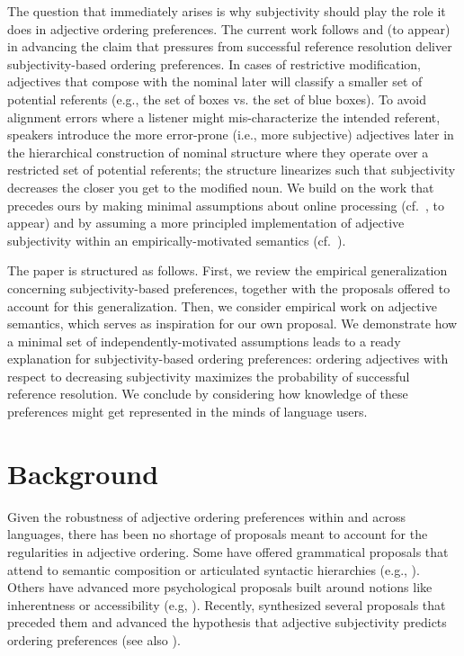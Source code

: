 \documentclass[10pt,a4paper]{article}
\begin{document}
The question that immediately arises is why subjectivity should play the role it does in adjective ordering preferences. The current work follows  and \citeauthor{scontrasetalSPadjectives} (to appear) in advancing the claim that pressures from successful reference resolution deliver subjectivity-based ordering preferences. In cases of restrictive modification, adjectives that compose with the nominal later will classify a smaller set of potential referents (e.g., the set of boxes vs. the set of blue boxes). To avoid alignment errors where a listener might mis-characterize the intended referent, speakers introduce the more error-prone (i.e., more subjective) adjectives later in the hierarchical construction of nominal structure where they operate over a restricted set of potential referents; the structure linearizes such that subjectivity decreases the closer you get to the modified noun. 
We build on the work that precedes ours by making minimal assumptions about online processing (cf.~\citeauthor{scontrasetalSPadjectives}, to appear) and by assuming a more principled implementation of adjective subjectivity within an empirically-motivated semantics (cf.~).

The paper is structured as follows. First, we review the empirical generalization concerning subjectivity-based preferences, together with the proposals offered to account for this generalization. Then, we consider empirical work on adjective semantics, which serves as inspiration for our own proposal. We demonstrate how a minimal set of independently-motivated assumptions leads to a ready explanation for subjectivity-based ordering preferences: ordering adjectives with respect to decreasing subjectivity maximizes the probability of successful reference resolution. We conclude by considering how knowledge of these preferences might get represented in the minds of language users.



\section{Background}

Given the robustness of adjective ordering preferences within and across languages, there has been no shortage of proposals meant to account for the regularities in adjective ordering. Some have offered grammatical proposals that attend to semantic composition or articulated syntactic hierarchies (e.g., ). Others have advanced more psychological proposals built around notions like inherentness or accessibility (e.g, ). Recently,  synthesized several proposals that preceded them and advanced the hypothesis that adjective subjectivity predicts ordering preferences (see also ). 
\end{document}
